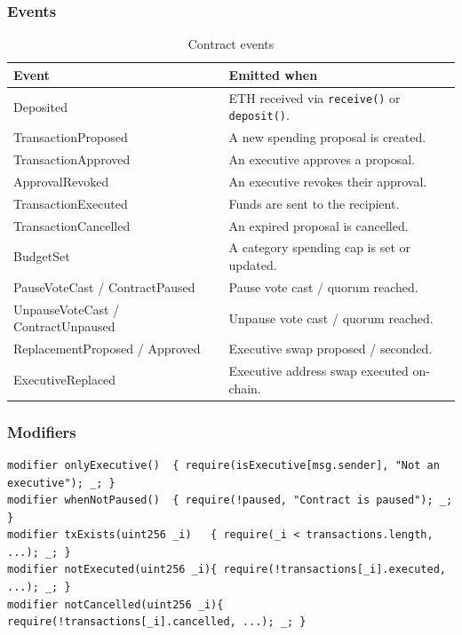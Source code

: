 \documentclass[12pt,a4paper]{article}
\begin{document}
\subsubsection*{Events}

\begin{table}[h]
  \centering
  \begin{tabularx}{\linewidth}{>{\ttfamily}lX}
    \toprule
    Event & Emitted when \\
    \midrule
    Deposited & ETH received via \texttt{receive()} or \texttt{deposit()}. \\
    TransactionProposed & A new spending proposal is created. \\
    TransactionApproved & An executive approves a proposal. \\
    ApprovalRevoked & An executive revokes their approval. \\
    TransactionExecuted & Funds are sent to the recipient. \\
    TransactionCancelled & An expired proposal is cancelled. \\
    BudgetSet & A category spending cap is set or updated. \\
    PauseVoteCast / ContractPaused & Pause vote cast / quorum reached. \\
    UnpauseVoteCast / ContractUnpaused & Unpause vote cast / quorum reached. \\
    ReplacementProposed / Approved & Executive swap proposed / seconded. \\
    ExecutiveReplaced & Executive address swap executed on-chain. \\
    \bottomrule
  \end{tabularx}
  \caption{Contract events}
\end{table}

\subsubsection*{Modifiers}

\begin{lstlisting}[caption={Key modifiers}]
modifier onlyExecutive()  { require(isExecutive[msg.sender], "Not an executive"); _; }
modifier whenNotPaused()  { require(!paused, "Contract is paused"); _; }
modifier txExists(uint256 _i)   { require(_i < transactions.length, ...); _; }
modifier notExecuted(uint256 _i){ require(!transactions[_i].executed, ...); _; }
modifier notCancelled(uint256 _i){ require(!transactions[_i].cancelled, ...); _; }
\end{lstlisting}
\end{document}
